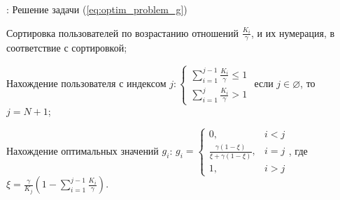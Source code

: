 \begin{algorithm}
  \caption{: Решение задачи (\ref{eq:optim_problem_g})}
	\label{alg:GTheoremAlgorithm}
  \begin{algorithmic}[1]
	 \item Сортировка пользователей по возрастанию отношений $\frac{K_i}{\gamma}$, и их нумерация, в соответствие с сортировкой;
	 \item Нахождение пользователя с индексом $j:\begin{cases}
		\sum\limits_{i=1}^{j-1} {\frac{K_i}{\gamma}} \leq 1 \\
		\sum\limits_{i=1}^{j} {\frac{K_i}{\gamma}} > 1
		\end{cases}$
		\newline
		если $j\in\varnothing$, то $j=N+1$;
	\item Нахождение оптимальных значений $g_i$: \newline
	$g_i=\begin{cases}
		0, & i < j \\
		\frac{\gamma (1 - \xi)}{\xi + \gamma (1-\xi)}, & i=j \\
		1, & i > j
		\end{cases}$,\newline
		где $\xi = \frac{\gamma}{K_j}\left(1 - \sum\limits_{i=1}^{j-1} {\frac{K_i}{\gamma}}\right)$.
  \end{algorithmic}
\end{algorithm}

